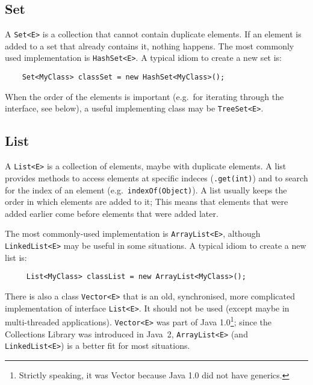 \subsection{Set}
\label{sec:set}

A \verb+Set<E>+ is a collection that cannot contain duplicate
elements. If an element is added to a set that already contains it,
nothing happens. The most commonly used implementation is
\verb+HashSet<E>+. A typical idiom to create a new set is:

\begin{verbatim}
    Set<MyClass> classSet = new HashSet<MyClass>();
\end{verbatim}

When the order of the elements is important (e.g.~for iterating
through the interface, see below), a useful implementing class may be
\verb+TreeSet<E>+. 

\subsection{List}
\label{sec:lists}

A \verb+List<E>+ is a collection of elements, maybe with duplicate
elements. 
%
A list provides methods to access
elements at specific indeces (\verb+.get(int)+) and to search for
the index of an element (e.g.~\verb+indexOf(Object)+). 
%
A list usually keeps the order in which elements are added to it; 
This means that elements that were added earlier come before
elements that were added later. 
%

The most commonly-used implementation is \verb+ArrayList<E>+, although
\verb+LinkedList<E>+ may be useful in some situations. A typical idiom to
create a new list is:

\begin{verbatim}
     List<MyClass> classList = new ArrayList<MyClass>();
\end{verbatim}

There is also a
class \verb+Vector<E>+ that is an old, synchronised, more complicated
implementation of interface \verb+List<E>+. It should not be
used (except maybe in multi-threaded applications). \verb+Vector<E>+ was
part of Java 1.0\footnote{Strictly speaking, it was Vector because
  Java 1.0 did not have generics.}; 
since the Collections Library was introduced in
Java~2, \verb+ArrayList<E>+ (and \verb+LinkedList<E>+)
is a better fit for most situations. 

